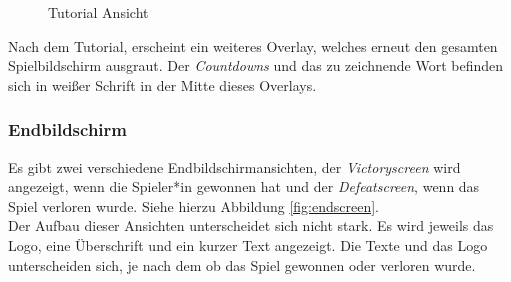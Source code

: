 \documentclass[11pt]{article}
\begin{document}
\begin{figure}[H]
\centering
\caption{\label{fig:tutorial}Tutorial Ansicht}
\end{figure} 

Nach dem Tutorial, erscheint ein weiteres Overlay, welches erneut den gesamten Spielbildschirm ausgraut. Der \textit{Countdowns} und das zu zeichnende Wort befinden sich in weißer Schrift in der Mitte dieses Overlays.

\subsubsection{Endbildschirm}

Es gibt zwei verschiedene Endbildschirmansichten, der \textit{Victoryscreen} wird angezeigt, wenn die Spieler*in gewonnen hat und der \textit{Defeatscreen}, wenn das Spiel verloren wurde. Siehe hierzu Abbildung \ref{fig:endscreen}.\\
Der Aufbau dieser Ansichten unterscheidet sich nicht stark. Es wird jeweils das Logo, eine Überschrift und ein kurzer Text angezeigt. Die Texte und das Logo unterscheiden sich, je nach dem ob das Spiel gewonnen oder verloren wurde.
\end{document}
